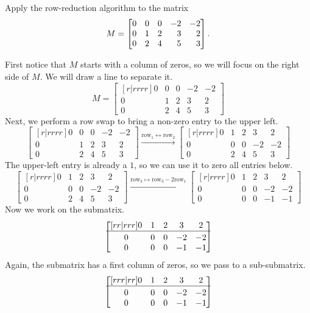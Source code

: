 \begin{example}
	Apply the row-reduction algorithm to the matrix
	\[
		M=\mat{0&0&0&-2&-2\\0&1&2&3&2\\0&2&4&5&3}.
	\]
	
	First notice that $M$ starts with a column of zeros, so we will focus on
	the right side of $M$. We will draw a line to separate it.
	\[
	M=\begin{bmatrix}[r|rrrr]
		0&0&0&-2&-2\\0&1&2&3&2\\0&2&4&5&3
	\end{bmatrix}
	\]
	Next, we perform a row swap to bring a non-zero entry to the upper left.
	\[
	\begin{bmatrix}[r|rrrr]
		0&0&0&-2&-2\\0&1&2&3&2\\0&2&4&5&3
	\end{bmatrix}
	\xrightarrow{\text{row}_1\leftrightarrow\text{row}_2}
	\begin{bmatrix}[r|rrrr]
		0&1&2&3&2\\0&0&0&-2&-2\\0&2&4&5&3
	\end{bmatrix}
	\]
	The upper-left entry is already a $1$, so we can use it to zero all entries below.
	\[
	\begin{bmatrix}[r|rrrr]
		0&1&2&3&2\\0&0&0&-2&-2\\0&2&4&5&3
	\end{bmatrix}
	\xrightarrow{\text{row}_3\mapsto\text{row}_3-2\text{row}_1}
	\begin{bmatrix}[r|rrrr]
		0&1&2&3&2\\0&0&0&-2&-2\\0&0&0&-1&-1
	\end{bmatrix}
	\]
	Now we work on the submatrix.
	\[
	\begin{bmatrix}[rr|rrr]
		0&1&2&3&2\\
		\hline\\[\dimexpr-\normalbaselineskip+2pt]
		0&0&0&-2&-2\\0&0&0&-1&-1
	\end{bmatrix}
	\]
	Again, the submatrix has a first column of zeros, so we pass to a sub-submatrix.
	\[
	\begin{bmatrix}[rrr|rr]
		0&1&2&3&2\\
		\hline\\[\dimexpr-\normalbaselineskip+2pt]
		0&0&0&-2&-2\\0&0&0&-1&-1

\end{bmatrix}\]
\end{example}
